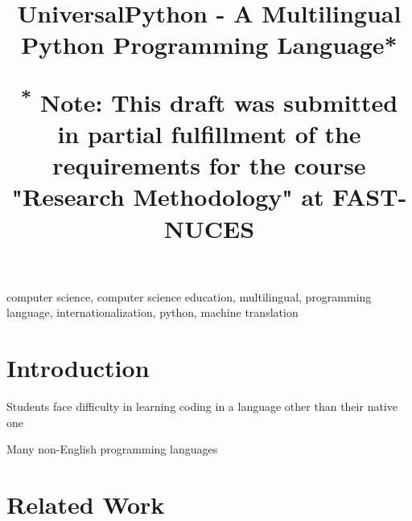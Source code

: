 \documentclass[conference]{IEEEtran}
\begin{document}
\title{UniversalPython - A Multilingual Python Programming Language*\\
{\footnotesize \textsuperscript{*}
Note: This draft was submitted in partial fulfillment of the requirements for the course "Research Methodology"
at FAST-NUCES

}
}

\author{
}

\maketitle

\begin{abstract}
\end{abstract}

\begin{IEEEkeywords}
computer science, computer science education, multilingual, programming language, internationalization, python, machine translation
\end{IEEEkeywords}

\section{Introduction}

Students face difficulty in learning coding in a language other than their native one \cite{Difficulties_of_Learning}

Many non-English programming languages \cite{Wiki_NonEnglish}

\section{Related Work}
\end{document}
